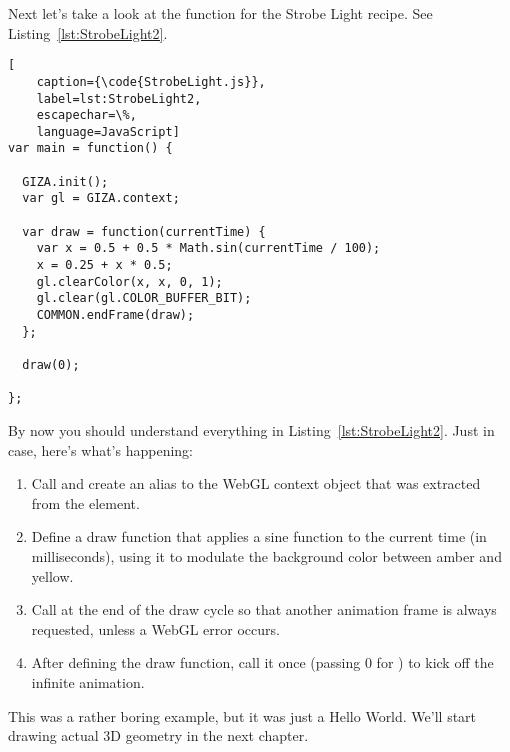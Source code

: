 Next let's take a look at the  function for the Strobe Light recipe.  See Listing~\ref{lst:StrobeLight2}.

\begin{lstlisting}[
    caption={\code{StrobeLight.js}},
    label=lst:StrobeLight2,
    escapechar=\%,
    language=JavaScript]
var main = function() {

  GIZA.init();
  var gl = GIZA.context;

  var draw = function(currentTime) {
    var x = 0.5 + 0.5 * Math.sin(currentTime / 100);
    x = 0.25 + x * 0.5;
    gl.clearColor(x, x, 0, 1);
    gl.clear(gl.COLOR_BUFFER_BIT);
    COMMON.endFrame(draw);
  };

  draw(0);

};
\end{lstlisting} 

By now you should understand everything in Listing~\ref{lst:StrobeLight2}.  Just in case, here's what's happening:

\begin{enumerate}
\item Call  and create an alias to the WebGL context object that was extracted from the  element.
\item Define a draw function that applies a sine function to the current time (in milliseconds), using it to modulate the background color between amber and yellow.
\item Call  at the end of the draw cycle so that another animation frame is always requested, unless a WebGL error occurs.
\item After defining the draw function, call it once (passing 0 for ) to kick off the infinite animation.
\end{enumerate}

This was a rather boring example, but it was just a Hello World.  We'll start drawing actual 3D geometry in the next chapter.
